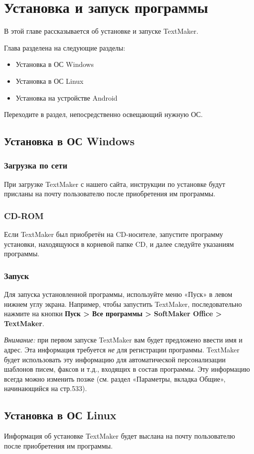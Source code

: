 \documentclass[a4paper,10pt]{article}
\begin{document}
\section{Установка и запуск программы}
В этой главе рассказывается об установке и запуске TextMaker.

Глава разделена на следующие разделы:
\begin{itemize}
 \item Установка в ОС Windows
 \item Установка в ОС Linux
 \item Установка на устройстве Android
\end{itemize}
Переходите в раздел, непосредственно освещающий нужную ОС.
\subsection{Установка в ОС Windows}
\subsubsection{Загрузка по сети}
При загрузке TextMaker с нашего сайта, инструкции по установке будут присланы на почту пользователю после приобретения им программы.
\subsubsection{CD-ROM}
Если TextMaker был приобретён на CD-носителе, запустите программу установки, находящуюся в корневой папке CD, и далее следуйте указаниям программы.
\subsubsection{Запуск}
Для запуска установленной программы, используйте меню «Пуск» в левом нижнем углу экрана. Например, чтобы запустить TextMaker, последовательно нажмите на кнопки \textbf{Пуск > Все программы > SoftMaker Office > TextMaker}.

{\footnotesize \textit{Внимание:} при первом запуске TextMaker вам будет предложено ввести имя и адрес. Эта информация требуется \textit{не} для регистрации программы. TextMaker будет использовать эту информацию для автоматической персонализации шаблонов писем, факсов и т.д., входящих в состав программы. Эту информацию всегда можно изменить позже (см. раздел «Параметры, вкладка Общие», начинающийся на стр.533).}

\subsection{Установка в ОС Linux}
Информация об установке TextMaker будет выслана на почту пользователю после приобретения им программы.
\end{document}
